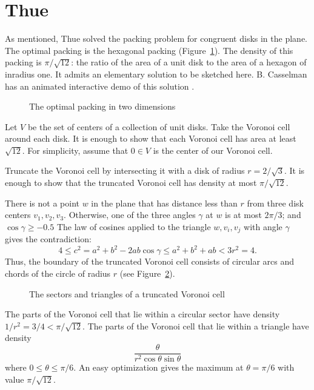 \section{Thue}\label{sec:thue}


As mentioned, Thue solved the packing problem for congruent disks in
the plane.  The optimal packing is the hexagonal packing
(Figure~\ref{fig:2D-hex}).  The density of this packing is
$\pi/\sqrt{12}$: the ratio of the area of a unit disk to the area of a
hexagon of inradius one.  It admits an elementary solution to be
sketched here.  B. Casselman has an animated interactive demo of this
solution \cite{casselman:pennies}.

\begin{figure}[htb]
  \centering
  \caption{The optimal packing in two dimensions}
  \label{fig:2D-hex}
\end{figure}

Let $V$ be the set of centers of a collection of unit disks.  Take the
Voronoi cell around each disk.  It is enough to show that each Voronoi
cell has area at least $\sqrt{12}$.  For simplicity, assume that $0\in
V$ is the center of our Voronoi cell.

Truncate the Voronoi cell by intersecting it with a disk of radius
$r=2/\sqrt3$.  It is enough to show that the truncated Voronoi cell
has density at most $\pi/\sqrt{12}$.

There is not a point $w$ in the plane that has distance less than $r$
from three disk centers $v_1,v_2,v_3$.  Otherwise, one of the three
angles $\gamma$ at $w$ is at most $2\pi/3$; and $\cos\gamma\ge -0.5$
The law of cosines applied to the triangle $w,v_i,v_j$ with angle
$\gamma$ gives the contradiction:
   \begin{displaymath}
   4 \le c^2 = a^2 + b^2 - 2 a b \cos\gamma 
   \le a^2 + b^2 + a b < 3r^2 = 4.
   \end{displaymath}
Thus, the boundary of the truncated Voronoi cell consists of circular
arcs and chords of the circle of radius $r$ (see Figure~\ref{fig:2D-proof}).

\begin{figure}[htb]
  \centering
  \caption{The sectors and triangles of a truncated Voronoi cell}
  \label{fig:2D-proof}
\end{figure}

The parts of the Voronoi cell that lie within a circular sector have
density $1/r^2 = 3/4 < \pi/\sqrt{12}$.  The parts of the Voronoi cell
that lie within a triangle have density
   \begin{equation}\label{eqn:rog2d}
   \frac{\theta}{r^2 \cos\theta\sin\theta}
   \end{equation}
where $0 \le \theta\le \pi/6$.  An easy optimization gives the maximum
at $\theta=\pi/6$ with value $\pi/\sqrt{12}$.


